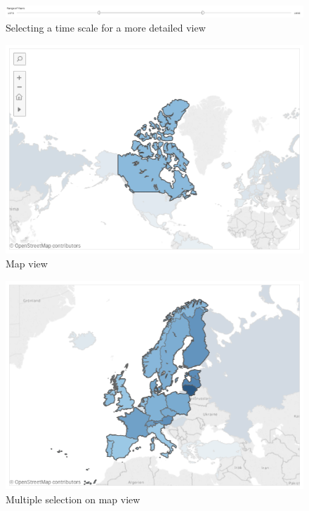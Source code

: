 \documentclass{vgtc}                          %
\begin{document}
\begin{itemize}
\begin{figure}[tb]
\centering
\includegraphics[width=\columnwidth]{image/chris/researcher02.png}
\caption{Selecting a time scale for a more detailed view}
\label{fig:resTime} 
\end{figure}

\begin{figure}[tb]
\centering
\includegraphics[width=\columnwidth]{image/chris/researcher03.png}
\caption{Map view}
\label{fig:resMap} 
\end{figure}

\begin{figure}[tb]
\centering
\includegraphics[width=\columnwidth]{image/chris/researcher04.png}
\caption{Multiple selection on map view}
\label{fig:resMapM} 
\end{figure}


\end{itemize}
\end{document}
